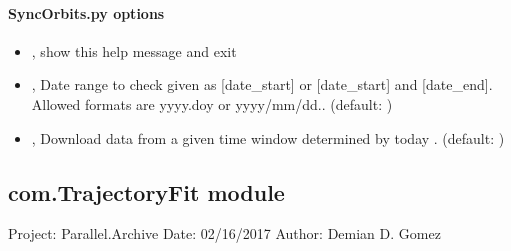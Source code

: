 \documentclass[letterpaper,10pt,english]{sphinxmanual}
\begin{document}
\paragraph{SyncOrbits.py options}
\label{\detokenize{com:SyncOrbits.py-options}}\begin{itemize}
\item {} 
\sphinxAtStartPar
{\hyperref[\detokenize{com:SyncOrbits.py--h}]{}}, {\hyperref[\detokenize{com:SyncOrbits.py---help}]{}} \sphinxhyphen{} show this help message and exit

\item {} 
\sphinxAtStartPar
{\hyperref[\detokenize{com:SyncOrbits.py--date}]{}} , {\hyperref[\detokenize{com:SyncOrbits.py---date_range}]{}}  \sphinxhyphen{} Date range to check given as {[}date\_start{]} or {[}date\_start{]} and {[}date\_end{]}. Allowed formats are yyyy.doy or yyyy/mm/dd.. (default: )

\item {} 
\sphinxAtStartPar
{\hyperref[\detokenize{com:SyncOrbits.py--win}]{}} , {\hyperref[\detokenize{com:SyncOrbits.py---window}]{}}  \sphinxhyphen{} Download data from a given time window determined by today \sphinxhyphen{} . (default: )

\end{itemize}


\subsection{com.TrajectoryFit module}
\label{\detokenize{com:module-com.TrajectoryFit}}\label{\detokenize{com:com-trajectoryfit-module}}
\sphinxAtStartPar
Project: Parallel.Archive
Date: 02/16/2017
Author: Demian D. Gomez
\end{document}
